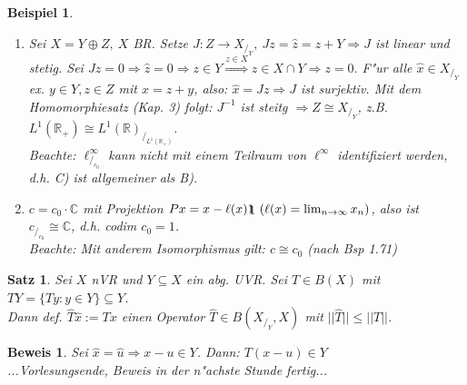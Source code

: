 \documentclass[a4paper,11pt]{book}
\newcommand{\R}{{\mathbb R}}
\newcommand{\C}{{\mathbb C}}
\newcommand{\id}{1\hspace{-0,9ex}\raisebox{-0,2ex}{1}}
\newtheorem{Sa}[Def]{Satz}
\newtheorem{Bsp}[Def]{Beispiel}
\theoremstyle{nonumberplain}
\newtheorem{Bew}[Def]{Beweis}
\begin{document}
\begin{Bsp}
\begin{enumerate}
\item[a)] Sei $X = Y \oplus Z,\ X$ BR. Setze $J: Z \rightarrow X_{/_Y},\ Jz = \hat{z} = z+Y \Rightarrow J$ ist linear und stetig. Sei $Jz = 0 \Rightarrow \hat{z} = 0 \Rightarrow z \in Y \stackrel{z \in X}{\Rightarrow} z \in X \cap Y \Rightarrow z = 0.$ F"ur alle $\hat{x} \in X_{/_Y}$ ex. $y \in Y, z \in Z$ mit $x = z+y$, also: $\hat{x} = Jz \Rightarrow J$ ist surjektiv. Mit dem Homomorphiesatz (Kap. 3) folgt: $J^{-1}$ ist steitg $\Rightarrow Z \cong X_{/_Y}$, z.B. $L^1(\R_+) \cong L^1(\R)_{/_{L^1(\R_+)}}$.\\
Beachte: $\ell_{/_{c_0}}^{\infty}$ kann nicht mit einem Teilraum von $\ell^{\infty}$ identifiziert werden, d.h. C) ist allgemeiner als B).

\item[b)] $c = c_0 \cdot \C$ mit Projektion $Px = x - \ell(x) \id \ (\ell(x)=\lim_{n \rightarrow \infty} x_n)$, also ist $c_{/_{c_0}} \cong \C$, d.h. codim $c_0 = 1$.\\
Beachte: Mit anderem Isomorphismus gilt: $c \cong c_0$ (nach Bsp 1.71)
\end{enumerate}
\end{Bsp}

\begin{Sa}
Sei $X$ nVR und $Y \subseteq X$ ein abg. UVR. Sei $T \in B(X)$ mit $TY = \{ Ty: y \in Y \} \subseteq Y$.\\
Dann def. $\hat{T} \hat{x} := Tx$ einen Operator $\hat{T} \in B(X_{/_Y},X)$ mit $||\hat{T}|| \leq ||T||$.
\end{Sa}

\begin{Bew}
Sei $\hat{x} = \hat{u} \Rightarrow x-u \in Y$. Dann: $T(x-u) \in Y$\\
...Vorlesungsende, Beweis in der n"achste Stunde fertig...
\end{Bew}
\end{document}
